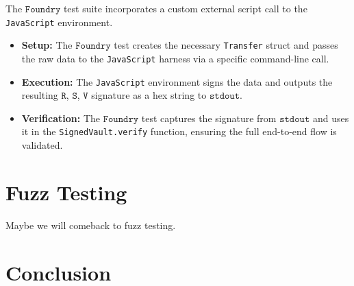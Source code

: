 \documentclass{article}
\begin{document}
The $\texttt{Foundry}$ test suite incorporates a custom external script call to the \texttt{JavaScript} environment.
\begin{itemize}
    \item \textbf{Setup:} The $\texttt{Foundry}$ test creates the necessary \texttt{Transfer} struct and passes the raw data to the \texttt{JavaScript} harness via a specific command-line call.
    \item \textbf{Execution:} The \texttt{JavaScript} environment signs the data and outputs the resulting $\texttt{R}$, $\texttt{S}$, $\texttt{V}$ signature as a hex string to $\texttt{stdout}$.
    \item \textbf{Verification:} The $\texttt{Foundry}$ test captures the signature from $\texttt{stdout}$ and uses it in the \texttt{SignedVault.verify} function, ensuring the full end-to-end flow is validated.
\end{itemize}

\section{Fuzz Testing}
Maybe we will comeback to fuzz testing.

\section{Conclusion}
\end{document}
